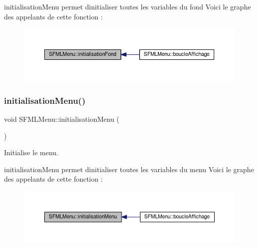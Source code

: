 initialisation\+Menu permet d\textquotesingle{}initialiser toutes les variables du fond Voici le graphe des appelants de cette fonction \+:\nopagebreak
\begin{figure}[H]
\begin{center}
\leavevmode
\includegraphics[width=350pt]{class_s_f_m_l_menu_a57d8df3871bf10c7ba48dcebdbbd7359_icgraph}
\end{center}
\end{figure}
\mbox{\label{class_s_f_m_l_menu_a324c14139ab2c9587a0df5050397fa95}} 
\subsubsection{\texorpdfstring{initialisation\+Menu()}{initialisationMenu()}}
{\footnotesize\ttfamily void S\+F\+M\+L\+Menu\+::initialisation\+Menu (\begin{DoxyParamCaption}{ }\end{DoxyParamCaption})\hspace{0.3cm}{\ttfamily [private]}}



Initialise le menu. 

initialisation\+Menu permet d\textquotesingle{}initialiser toutes les variables du menu Voici le graphe des appelants de cette fonction \+:\nopagebreak
\begin{figure}[H]
\begin{center}
\leavevmode
\includegraphics[width=350pt]{class_s_f_m_l_menu_a324c14139ab2c9587a0df5050397fa95_icgraph}
\end{center}
\end{figure}
\mbox{\label{class_s_f_m_l_menu_a4eda2cf8b00a4446674430cce575cbb5}} 
